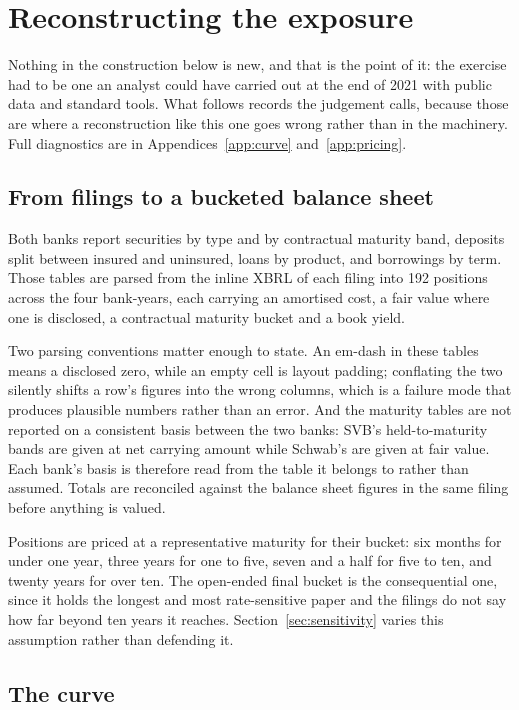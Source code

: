 \section{Reconstructing the exposure}
\label{sec:reconstruction}

Nothing in the construction below is new, and that is the point of it: the exercise
had to be one an analyst could have carried out at the end of 2021 with public data
and standard tools. What follows records the judgement calls, because those are where
a reconstruction like this one goes wrong rather than in the machinery. Full
diagnostics are in Appendices~\ref{app:curve} and~\ref{app:pricing}.

\subsection{From filings to a bucketed balance sheet}

Both banks report securities by type and by contractual maturity band, deposits split
between insured and uninsured, loans by product, and borrowings by term. Those tables
are parsed from the inline XBRL of each filing into 192 positions across the four
bank-years, each carrying an amortised cost, a fair value where one is disclosed, a
contractual maturity bucket and a book yield.

Two parsing conventions matter enough to state. An em-dash in these tables means a
disclosed zero, while an empty cell is layout padding; conflating the two silently
shifts a row's figures into the wrong columns, which is a failure mode that produces
plausible numbers rather than an error. And the maturity tables are not reported on a
consistent basis between the two banks: SVB's held-to-maturity bands are given at
net carrying amount while Schwab's are given at fair value. Each bank's basis is
therefore read from the table it belongs to rather than assumed. Totals are
reconciled against the balance sheet figures in the same filing before anything is
valued.

Positions are priced at a representative maturity for their bucket: six months for
under one year, three years for one to five, seven and a half for five to ten, and
twenty years for over ten. The open-ended final bucket is the consequential one,
since it holds the longest and most rate-sensitive paper and the filings do not say
how far beyond ten years it reaches. Section~\ref{sec:sensitivity} varies this
assumption rather than defending it.

\subsection{The curve}

